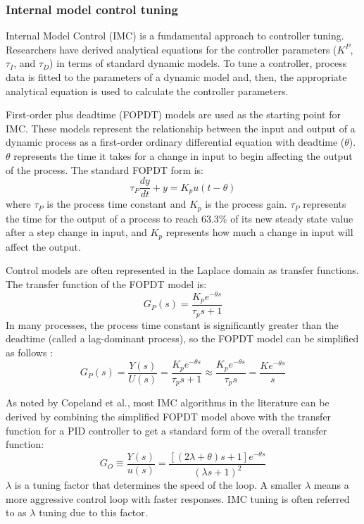 \subsubsection{Internal model control tuning}
Internal Model Control (IMC) is a fundamental approach to controller tuning. Researchers have derived analytical equations for the controller parameters ($K^P$, $\tau_I$, and $\tau_D$) in terms of standard dynamic models. To tune a controller, process data is  fitted to the parameters of a dynamic model and, then, the appropriate analytical equation is used to calculate the controller parameters.

First-order plus deadtime (FOPDT) models are used as the starting point for IMC. These models represent the relationship between the input and output of a dynamic process as a first-order ordinary differential equation with deadtime ($\theta$). $\theta$ represents the time it takes for a change in input to begin affecting the output of the process. The standard FOPDT form is:
\begin{equation}
    \tau_P \frac{dy}{dt} + y = K_p u(t-\theta)
\end{equation}
where $\tau_P$ is the process time constant and $K_p$ is the process gain. $\tau_P$ represents the time for the output of a process to reach 63.3\% of its new steady state value after a step change in input, and $K_p$ represents how much a change in input will affect the output.  

Control models are often represented in the Laplace domain as transfer functions. The transfer function of the FOPDT model is:
\begin{equation}
    G_P(s) = \frac{K_p e^{-\theta s}}{\tau_p s +1}
\end{equation}
In many processes, the process time constant is significantly greater than the deadtime (called a lag-dominant process), so the FOPDT model can be simplified as follows \citep{Copeland2010}:
\begin{equation}
    G_P(s) = \frac{Y(s)}{U(s)} = \frac{K_p e^{-\theta s}}{\tau_p s +1} \approx \frac{K_p e^{-\theta s}}{\tau_p s } = \frac{K e^{-\theta s}}{s}
\end{equation}

As noted by Copeland et al.\citep{Copeland2010}, most IMC algorithms in the literature can be derived by combining the simplified FOPDT model above with the transfer function for a PID controller to get a standard form of the overall transfer function:
\begin{equation}
    G_O \equiv \frac{Y(s)}{u(s)} = \frac{[(2\lambda + \theta)s+1]e^{-\theta s}}{(\lambda s+1)^2}
\end{equation}
$\lambda$ is a tuning factor that determines the speed of the loop. A smaller $\lambda$ means a more aggressive control loop with faster responses. IMC tuning is often referred to as $\lambda$ tuning due to this factor. 

